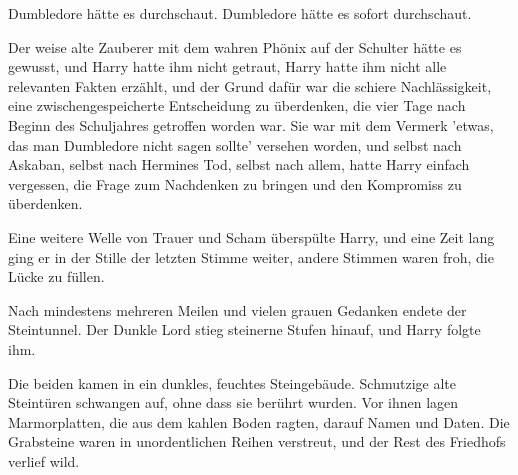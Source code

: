 Dumbledore hätte es durchschaut. Dumbledore hätte es sofort durchschaut.

Der weise alte Zauberer mit dem wahren Phönix auf der Schulter hätte es gewusst, und Harry hatte ihm nicht getraut, Harry hatte ihm nicht alle relevanten Fakten erzählt, und der Grund dafür war die schiere Nachlässigkeit, eine zwischengespeicherte Entscheidung zu überdenken, die vier Tage nach Beginn des Schuljahres getroffen worden war. Sie war mit dem Vermerk 'etwas, das man Dumbledore nicht sagen sollte' versehen worden, und selbst nach Askaban, selbst nach Hermines Tod, selbst nach allem, hatte Harry einfach vergessen, die Frage zum Nachdenken zu bringen und den Kompromiss zu überdenken.

Eine weitere Welle von Trauer und Scham überspülte Harry, und eine Zeit lang ging er in der Stille der letzten Stimme weiter, andere Stimmen waren froh, die Lücke zu füllen.

Nach mindestens mehreren Meilen und vielen grauen Gedanken endete der Steintunnel.
Der Dunkle Lord stieg steinerne Stufen hinauf, und Harry folgte ihm.

Die beiden kamen in ein dunkles, feuchtes Steingebäude. Schmutzige alte Steintüren schwangen auf, ohne dass sie berührt wurden.
Vor ihnen lagen Marmorplatten, die aus dem kahlen Boden ragten, darauf Namen und Daten. Die Grabsteine waren in unordentlichen Reihen verstreut, und der Rest des Friedhofs verlief wild.


